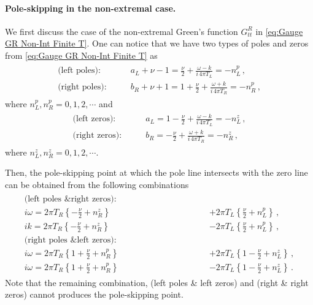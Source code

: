 \documentclass[11pt,a4paper]{article}
\begin{document}
\paragraph{Pole-skipping in the non-extremal case.}
We first discuss the case of the non-extremal Green's function $G^R_{tt}$ in \eqref{eq:Gauge GR Non-Int Finite T}. One can notice that we have two types of poles and zeros from \eqref{eq:Gauge GR Non-Int Finite T} as
\begin{align} \label{FPF1 Gauge tt}
\begin{split}
    \text{(left poles):} \qquad & a_L+\nu-1 = \frac{\nu}{2} + \frac{\omega-k}{i\, 4 \pi T_L} = - n^p_L\,,\\
    \text{(right poles):} \qquad & b_R+\nu+1 = 1+\frac{\nu}{2} + \frac{\omega+k}{i\, 4 \pi T_R} = - n^p_R\,,
\end{split}
\end{align}
where $n^p_L,n^p_R=0,1,2,\cdots$ and
\begin{align} \label{FPF2 Gauge tt}
\begin{split}
    \text{(left zeros):} \qquad & a_L = 1-\frac{\nu}{2} + \frac{\omega-k}{i\, 4 \pi T_L} = - n^z_L\,,\\
    \text{(right zeros):} \qquad & b_R = - \frac{\nu}{2} + \frac{\omega+k}{i\, 4 \pi T_R} = - n^z_R\,,
\end{split}
\end{align}
where $n^z_L,n^z_R=0,1,2,\cdots$.

Then, the pole-skipping point at which the pole line intersects with the zero line can be obtained from the following combinations\\
\begin{align} \label{eq:Gauge tt p-s Non-Int Finite T}
\begin{split}
    \text{(left poles \& right zeros):} \qquad\qquad\qquad\qquad\qquad \\
        i \omega = 2 \pi T_R \left\{ -\frac{\nu}{2} + n^z_R \right\} &+ 2 \pi T_L \left\{ \frac{\nu}{2} + n^p_L \right\}\,,\\
        i k = 2 \pi T_R \left\{ -\frac{\nu}{2} + n^z_R \right\} &- 2 \pi T_L \left\{ \frac{\nu}{2} + n^p_L \right\}\,,\\
    \text{(right poles \& left zeros):} \qquad\qquad\qquad\qquad\qquad \\
        i \omega = 2 \pi T_R \left\{ 1+\frac{\nu}{2} + n^p_R \right\} &+ 2 \pi T_L \left\{ 1 - \frac{\nu}{2} + n^z_L \right\}\,,\\
        i \omega = 2 \pi T_R \left\{ 1+\frac{\nu}{2} + n^p_R \right\} &- 2 \pi T_L \left\{ 1 - \frac{\nu}{2} + n^z_L \right\}\,.
\end{split}
\end{align}
Note that the remaining combination, (left poles \& left zeros) and (right \& right zeros) cannot produces the pole-skipping point.\\
\end{document}
